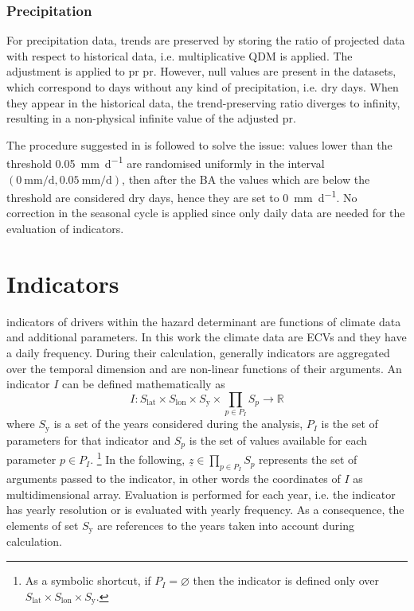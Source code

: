 \subsubsection{Precipitation}
For precipitation data, trends are preserved by storing the ratio of projected data with respect to historical data, i.e. multiplicative \gls{QDM} is applied.
The adjustment is applied to \glsdesc{pr} \gls{pr}. However, null values are present in the datasets, which correspond to days without any kind of precipitation, i.e. dry days. When they appear in the historical data, the trend-preserving ratio diverges to infinity, resulting in a non-physical infinite value of the adjusted \gls{pr}.

The procedure suggested in \cite[6945]{2015CannonBiasCorrection} is followed to solve the issue: values lower than the threshold \qty{0.05}{\milli\metre\per\day} are randomised uniformly in the interval $(\qty{0}{\milli\metre\per\day}, \qty{0.05}{\milli\metre\per\day})$, then after the \gls{BA} the values which are below the threshold are considered dry days, hence they are set to \qty{0}{\milli\metre\per\day}. No correction in the seasonal cycle is applied since only daily data are needed for the evaluation of \glspl{indicator}.



\section{Indicators}
\label{sec:Indicators}
\Glspl{indicator} of \glspl{driver} within the \gls{hazard} \gls{determinant} are functions of climate data and additional parameters. In this work the climate data are \glspl{ECV} and they have a daily frequency.
During their calculation, generally \glspl{indicator} are aggregated over the temporal dimension and are non-linear functions of their arguments.
An \gls{indicator} $I$ can be defined mathematically as
\begin{equation}
  \label{eq:math_indicator}
  I : S_\text{lat} \times S_\text{lon} \times S_\text{y} \times \prod_{p \in P_I} S_p \to \mathbb{R}
\end{equation}
where $S_\text{y}$ is a set of the years considered during the analysis, $P_I$ is the set of parameters for that indicator and $S_p$ is the set of values available for each parameter $p \in P_I$.%
\footnote{As a symbolic shortcut, if $P_I = \varnothing$ then the indicator is defined only over $S_\text{lat} \times S_\text{lon} \times S_\text{y}$.}
In the following, $\underline{z} \in \prod_{p \in P_I} S_p$ represents the set of arguments passed to the \gls{indicator}, in other words the coordinates of $I$ as multidimensional array.
Evaluation is performed for each year, i.e. the \gls{indicator} has yearly resolution or is evaluated with yearly frequency. As a consequence, the elements of set $S_\text{y}$ are references to the years taken into account during calculation.

